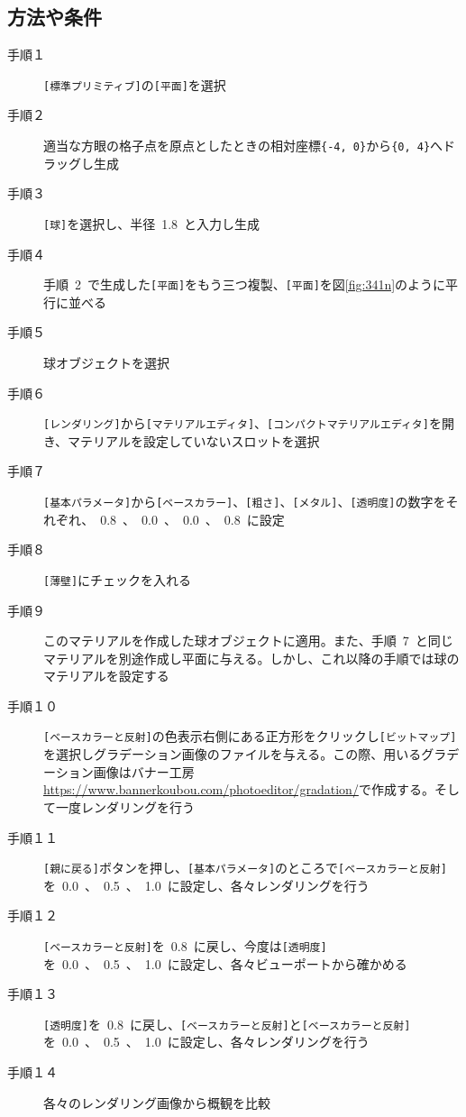 \documentclass[a4j]{jarticle}
\begin{document}
\subsection{方法や条件}
%
\begin{description}
  \item[手順１] \verb|[標準プリミティブ]|の\verb|[平面]|を選択
  \item[手順２] 適当な方眼の格子点を原点としたときの相対座標\verb|{-4, 0}|から\verb|{0, 4}|へドラッグし生成
  \item[手順３] \verb|[球]|を選択し、半径\ 1.8\ と入力し生成
  \item[手順４] 手順\ 2\ で生成した\verb|[平面]|をもう三つ複製、\verb|[平面]|を図\ref{fig:341n}のように平行に並べる
  \item[手順５] 球オブジェクトを選択
  \item[手順６] \verb|[レンダリング]|から\verb|[マテリアルエディタ]|、\verb|[コンパクトマテリアルエディタ]|を開き、マテリアルを設定していないスロットを選択
  \item[手順７] \verb|[基本パラメータ]|から\verb|[ベースカラー]|、\verb|[粗さ]|、\verb|[メタル]|、\verb|[透明度]|の数字をそれぞれ、\ 0.8\ 、\ 0.0\ 、\ 0.0\ 、\ 0.8\ に設定
  \item[手順８] \verb|[薄壁]|にチェックを入れる
  \item[手順９] このマテリアルを作成した球オブジェクトに適用。また、手順\ 7\ と同じマテリアルを別途作成し平面に与える。しかし、これ以降の手順では球のマテリアルを設定する
  \item[手順１０] \verb|[ベースカラーと反射]|の色表示右側にある正方形をクリックし\verb|[ビットマップ]|を選択しグラデーション画像のファイルを与える。この際、用いるグラデーション画像はバナー工房\url{https://www.bannerkoubou.com/photoeditor/gradation/}で作成する。そして一度レンダリングを行う
  \item[手順１１] \verb|[親に戻る]|ボタンを押し、\verb|[基本パラメータ]|のところで\verb|[ベースカラーと反射]|を\ 0.0\ 、\ 0.5\ 、\ 1.0\ に設定し、各々レンダリングを行う
  \item[手順１２] \verb|[ベースカラーと反射]|を\ 0.8\ に戻し、今度は\verb|[透明度]|を\ 0.0\ 、\ 0.5\ 、\ 1.0\ に設定し、各々ビューポートから確かめる
  \item[手順１３] \verb|[透明度]|を\ 0.8\ に戻し、\verb|[ベースカラーと反射]|と\verb|[ベースカラーと反射]|を\ 0.0\ 、\ 0.5\ 、\ 1.0\ に設定し、各々レンダリングを行う
  \item[手順１４] 各々のレンダリング画像から概観を比較
\end{description}
\end{document}

